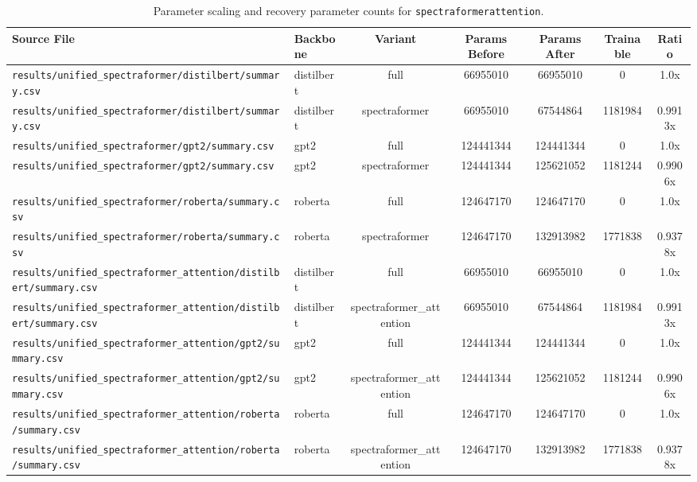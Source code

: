 \begin{table}[t]
\centering
\small
\begin{tabular}{llccccc}
\toprule
\textbf{Source File} & \textbf{Backbone} & \textbf{Variant} & \textbf{Params Before} & \textbf{Params After} & \textbf{Trainable} & \textbf{Ratio} \\
\midrule
\texttt{results/unified\_spectraformer/distilbert/summary.csv} & distilbert & full & 66955010 & 66955010 & 0 & 1.0x \\
\texttt{results/unified\_spectraformer/distilbert/summary.csv} & distilbert & spectraformer & 66955010 & 67544864 & 1181984 & 0.9913x \\
\texttt{results/unified\_spectraformer/gpt2/summary.csv} & gpt2 & full & 124441344 & 124441344 & 0 & 1.0x \\
\texttt{results/unified\_spectraformer/gpt2/summary.csv} & gpt2 & spectraformer & 124441344 & 125621052 & 1181244 & 0.9906x \\
\texttt{results/unified\_spectraformer/roberta/summary.csv} & roberta & full & 124647170 & 124647170 & 0 & 1.0x \\
\texttt{results/unified\_spectraformer/roberta/summary.csv} & roberta & spectraformer & 124647170 & 132913982 & 1771838 & 0.9378x \\
\texttt{results/unified\_spectraformer\_attention/distilbert/summary.csv} & distilbert & full & 66955010 & 66955010 & 0 & 1.0x \\
\texttt{results/unified\_spectraformer\_attention/distilbert/summary.csv} & distilbert & spectraformer\_attention & 66955010 & 67544864 & 1181984 & 0.9913x \\
\texttt{results/unified\_spectraformer\_attention/gpt2/summary.csv} & gpt2 & full & 124441344 & 124441344 & 0 & 1.0x \\
\texttt{results/unified\_spectraformer\_attention/gpt2/summary.csv} & gpt2 & spectraformer\_attention & 124441344 & 125621052 & 1181244 & 0.9906x \\
\texttt{results/unified\_spectraformer\_attention/roberta/summary.csv} & roberta & full & 124647170 & 124647170 & 0 & 1.0x \\
\texttt{results/unified\_spectraformer\_attention/roberta/summary.csv} & roberta & spectraformer\_attention & 124647170 & 132913982 & 1771838 & 0.9378x \\
\bottomrule
\end{tabular}
\caption{Parameter scaling and recovery parameter counts for \texttt{spectraformerattention}.}
\label{tab:results_params_spectraformerattention}
\end{table}


